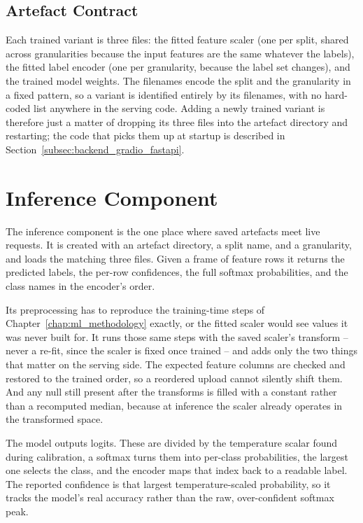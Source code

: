\subsection{Artefact Contract}
\label{subsec:artefact_contract}

\par Each trained variant is three files: the fitted feature scaler (one per split, shared across granularities because the input features are the same whatever the labels), the fitted label encoder (one per granularity, because the label set changes), and the trained model weights. The filenames encode the split and the granularity in a fixed pattern, so a variant is identified entirely by its filenames, with no hard-coded list anywhere in the serving code. Adding a newly trained variant is therefore just a matter of dropping its three files into the artefact directory and restarting; the code that picks them up at startup is described in Section~\ref{subsec:backend_gradio_fastapi}.

\section{Inference Component}
\label{sec:inference_layer}

\par The inference component is the one place where saved artefacts meet live requests. It is created with an artefact directory, a split name, and a granularity, and loads the matching three files. Given a frame of feature rows it returns the predicted labels, the per-row confidences, the full softmax probabilities, and the class names in the encoder's order.

\par Its preprocessing has to reproduce the training-time steps of Chapter~\ref{chap:ml_methodology} exactly, or the fitted scaler would see values it was never built for. It runs those same steps with the saved scaler's transform -- never a re-fit, since the scaler is fixed once trained -- and adds only the two things that matter on the serving side. The expected feature columns are checked and restored to the trained order, so a reordered upload cannot silently shift them. And any null still present after the transforms is filled with a constant rather than a recomputed median, because at inference the scaler already operates in the transformed space.

\par The model outputs logits. These are divided by the temperature scalar found during calibration, a softmax turns them into per-class probabilities, the largest one selects the class, and the encoder maps that index back to a readable label. The reported confidence is that largest temperature-scaled probability, so it tracks the model's real accuracy rather than the raw, over-confident softmax peak.

